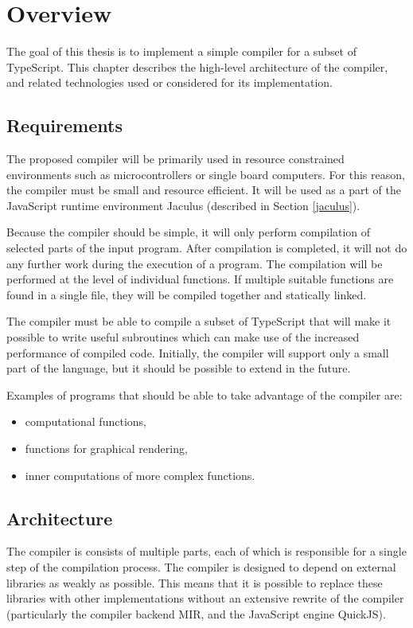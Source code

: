 \chapter{Overview}

The goal of this thesis is to implement a simple compiler for a subset of TypeScript. This chapter describes the high-level architecture of the compiler, and related technologies used or considered for its implementation.


\section{Requirements}

The proposed compiler will be primarily used in resource constrained environments such as microcontrollers or single board computers. For this reason, the compiler must be small and resource efficient. It will be used as a part of the JavaScript runtime environment Jaculus (described in Section \ref{jaculus}).

Because the compiler should be simple, it will only perform compilation of selected parts of the input program. After compilation is completed, it will not do any further work during the execution of a program. The compilation will be performed at the level of individual functions. If multiple suitable functions are found in a single file, they will be compiled together and statically linked.

The compiler must be able to compile a subset of TypeScript that will make it possible to write useful subroutines which can make use of the increased performance of compiled code. Initially, the compiler will support only a small part of the language, but it should be possible to extend in the future.

Examples of programs that should be able to take advantage of the compiler are:
\begin{itemize}
    \item computational functions,
    \item functions for graphical rendering,
    \item inner computations of more complex functions.
\end{itemize}


\section{Architecture}

The compiler is consists of multiple parts, each of which is responsible for a single step of the compilation process. The compiler is designed to depend on external libraries as weakly as possible. This means that it is possible to replace these libraries with other implementations without an extensive rewrite of the compiler (particularly the compiler backend MIR, and the JavaScript engine QuickJS).

